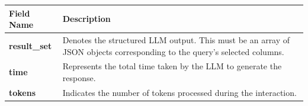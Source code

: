 \begin{table}[h]
    \centering
    \begin{tabular}{l p{}} 
        \toprule
        \textbf{Field Name} & \textbf{Description} \\
        \midrule
        \textbf{result\_set} & Denotes the structured LLM output. This must be an array of JSON objects corresponding to the query's selected columns. \\
        \textbf{time} & Represents the total time taken by the LLM to generate the response. \\
        \textbf{tokens} & Indicates the number of tokens processed during the interaction. \\
        \bottomrule
    \end{tabular}
\end{table}
